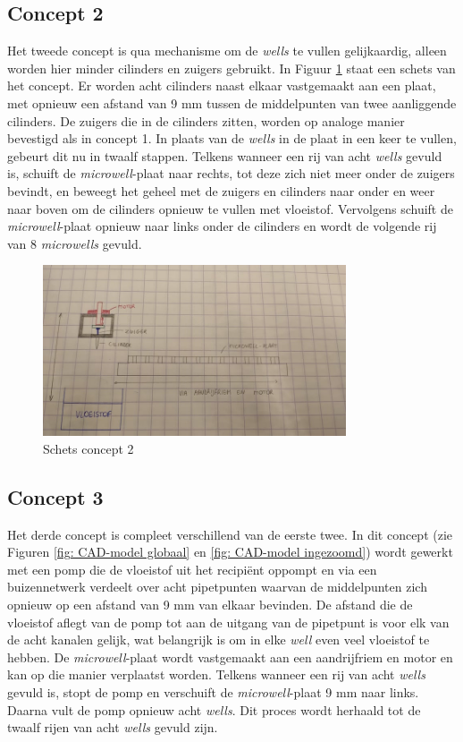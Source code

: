 \documentclass[a4paper,twoside,kulak]{kulakreport} %
\begin{document}
\subsection{Concept 2}
Het tweede concept is qua mechanisme om de \textit{wells} te vullen gelijkaardig, alleen worden hier minder cilinders en zuigers gebruikt. In Figuur \ref{fig: schets concept 2} staat een schets van het concept. Er worden acht cilinders naast elkaar vastgemaakt aan een plaat, met opnieuw een afstand van 9 mm tussen de middelpunten van twee aanliggende cilinders. De zuigers die in de cilinders zitten, worden op analoge manier bevestigd als in concept 1. In plaats van de \textit{wells} in de plaat in een keer te vullen, gebeurt dit nu in twaalf stappen. Telkens wanneer een rij van acht \textit{wells} gevuld is, schuift de \textit{microwell}-plaat naar rechts, tot deze zich niet meer onder de zuigers bevindt, en beweegt het geheel met de zuigers en cilinders naar onder en weer naar boven om de cilinders opnieuw te vullen met vloeistof. Vervolgens schuift de \textit{microwell}-plaat opnieuw naar links onder de cilinders en wordt de volgende rij van 8 \textit{microwells} gevuld.

\begin{figure}[h]
	\centering
	\includegraphics[width=0.8\textwidth]{fotoConcept2.jpg}
	\caption{Schets concept 2}
	\label{fig: schets concept 2}
	
\end{figure} 

\subsection{Concept 3}
Het derde concept is compleet verschillend van de eerste twee. In dit concept (zie Figuren \ref{fig: CAD-model globaal} en \ref{fig: CAD-model ingezoomd}) wordt gewerkt met een pomp die de vloeistof uit het recipiënt oppompt en via een buizennetwerk verdeelt over acht pipetpunten waarvan de middelpunten zich opnieuw op een afstand van 9 mm van elkaar bevinden. De afstand die de vloeistof aflegt van de pomp tot aan de uitgang van de pipetpunt is voor elk van de acht kanalen gelijk, wat belangrijk is om in elke \textit{well} even veel vloeistof te hebben. De \textit{microwell}-plaat wordt vastgemaakt aan een aandrijfriem en motor en kan op die manier verplaatst worden. Telkens wanneer een rij van acht \textit{wells} gevuld is, stopt de pomp en verschuift de \textit{microwell}-plaat 9 mm naar links. Daarna vult de pomp opnieuw acht \textit{wells}. Dit proces wordt herhaald tot de twaalf rijen van acht \textit{wells} gevuld zijn. 
\end{document}
